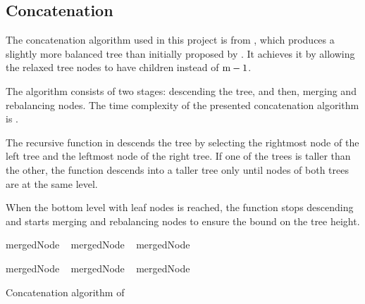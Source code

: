 \subsection{Concatenation}
The concatenation algorithm used in this project is from \cite{rrb-vector-practical-general-purpose-im-sequence}, which produces a slightly more balanced tree than initially proposed by \cite{efficient-immutable-vectors}. It achieves it by allowing the relaxed tree nodes to have \m{} children instead of $\m{} - 1$.

The algorithm consists of two stages: descending the tree, and then, merging and rebalancing nodes. The time complexity of the presented concatenation algorithm is .

The recursive function in  descends the tree by selecting the rightmost node of the left tree and the leftmost node of the right tree. If one of the trees is taller than the other, the function descends into a taller tree only until nodes of both trees are at the same level.

When the bottom level with leaf nodes is reached, the function stops descending and starts merging and rebalancing nodes to ensure the  bound on the tree height.

\begin{listing}[!ht]
    \begin{algorithmic}[1]
                \State mergedNode \la\ 
                \State \Return {}
                \State mergedNode \la\ 
                \State \Return {}
            \Else
                \State mergedNode \la\ \nil{}

                    \State mergedNode \la\ 
                \Else
                        \State mergedNode \la\ 
                    \Else
                        \State mergedNode \la\ 
                    \EndIf
                \EndIf

                \State \Return {}
            \EndIf
        \EndFunction
    \end{algorithmic}

    \caption{Concatenation algorithm of \treerrb{}}
    \label{lst:rrb-tree-concatenation}
\end{listing}

